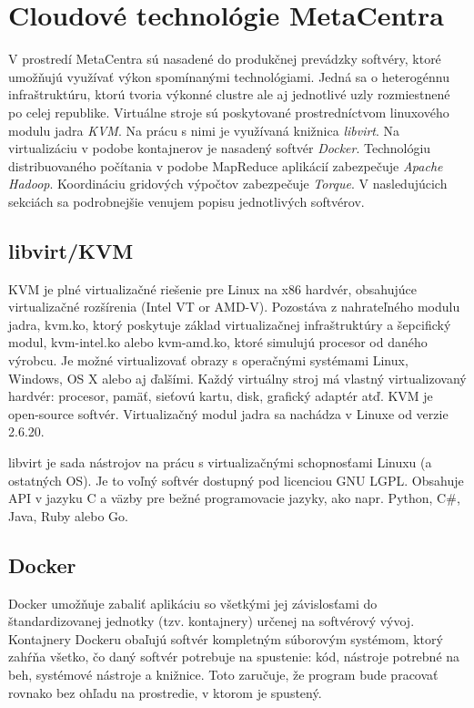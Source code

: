 \documentclass[11pt,final,oneside]{fithesis}
\begin{document}
\section{Cloudové technológie MetaCentra}
V prostredí MetaCentra sú nasadené do produkčnej prevádzky softvéry, ktoré umožňujú využívať výkon spomínanými technológiami. Jedná sa o heterogénnu infraštruktúru, ktorú tvoria výkonné clustre ale 
aj jednotlivé uzly rozmiestnené po celej republike. Virtuálne stroje sú poskytované prostredníctvom linuxového modulu jadra \textit{KVM}. Na prácu s nimi je využívaná knižnica \textit{libvirt}. 
Na virtualizáciu v podobe kontajnerov je nasadený softvér \textit{Docker}. Technológiu distribuovaného počítania v podobe MapReduce aplikácií zabezpečuje \textit{Apache Hadoop}.
Koordináciu gridových výpočtov zabezpečuje \textit{Torque}. V nasledujúcich sekciách sa podrobnejšie venujem popisu jednotlivých softvérov.
 
\subsection{libvirt/KVM}
KVM\footnotemark{} je plné virtualizačné riešenie pre Linux na x86 hardvér, obsahujúce virtualizačné rozšírenia (Intel VT or AMD-V).
Pozostáva z nahrateľného modulu jadra, kvm.ko, ktorý poskytuje základ virtualizačnej infraštruktúry a šepcifický modul, kvm-intel.ko alebo kvm-amd.ko, ktoré simulujú procesor od daného výrobcu.
Je možné virtualizovať obrazy s operačnými systémami Linux, Windows, OS X alebo aj ďalšími. Každý virtuálny stroj má vlastný virtualizovaný hardvér: procesor, pamäť, sieťovú kartu, disk, grafický adaptér atď. 
KVM je open-source softvér. Virtualizačný modul jadra sa nachádza v Linuxe od verzie 2.6.20.\cite{kvm}

libvirt je sada nástrojov na prácu s virtualizačnými schopnosťami Linuxu (a ostatných OS). Je to voľný softvér dostupný pod licenciou GNU LGPL. 
Obsahuje API v jazyku C a väzby pre bežné programovacie jazyky, ako napr. Python, C#, Java, Ruby alebo Go.\cite{libvirt}

\subsection{Docker}
Docker umožňuje zabaliť aplikáciu so všetkými jej závislosťami do štandardizovanej jednotky (tzv. kontajnery) určenej na softvérový vývoj. Kontajnery Dockeru obaľujú softvér kompletným súborovým systémom, ktorý
zahŕňa všetko, čo daný softvér potrebuje na spustenie: kód, nástroje potrebné na beh, systémové nástroje a knižnice. Toto zaručuje, že program bude pracovať rovnako bez ohľadu na prostredie, v ktorom
je spustený.\cite{docker}
\end{document}
